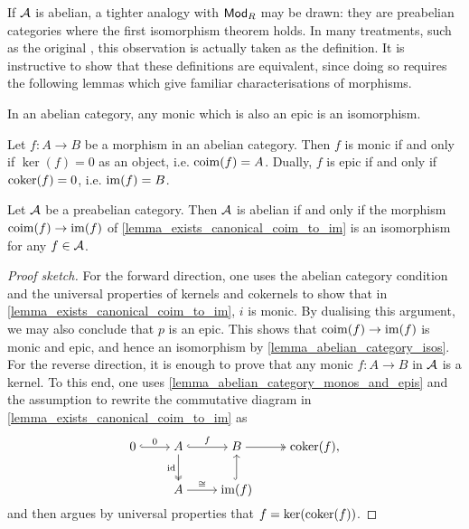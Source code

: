 

If $\mathcal{A}$ is abelian, a tighter analogy with ${\mathsf{Mod}}_{{R}}$ may be
drawn: they are preabelian categories where the first isomorphism theorem holds.
In many treatments, such as the original \cite{tohoku}, this
observation is actually taken as the definition.
It is instructive to show that these definitions are equivalent,
since doing so requires the following lemmas which give familiar
characterisations of morphisms.

\begin{lemma}
  \label{lemma_abelian_category_isos}
  In an abelian category, any monic which is also an epic is an isomorphism.
\end{lemma}

\begin{lemma}
  \label{lemma_abelian_category_monos_and_epis}
  Let $f: A \to B$ be a morphism in an abelian category.
  Then $f$ is monic if and only if $\ker(f) = 0$ as an object, i.e.
  $\operatorname{coim}(f) = A$.
  Dually, $f$ is epic if and only if $\operatorname{coker}(f) = 0$, i.e. $\operatorname{im}(f) = B$.
\end{lemma}

\begin{proposition}
  Let $\mathcal{A}$ be a preabelian category.
  Then $\mathcal{A}$ is abelian if and only if the morphism $\operatorname{coim}(f)
  \to \operatorname{im}(f)$ of \cref{lemma_exists_canonical_coim_to_im} is an
  isomorphism for any $f \in \mathcal{A}$.
\end{proposition}

\begin{proof}[Proof sketch]
  For the forward direction, one uses the abelian category condition
  and the universal properties of kernels and cokernels to show that
  in \cref{lemma_exists_canonical_coim_to_im}, $i$ is monic. By
  dualising this argument, we may also conclude that $p$ is an epic.
  This shows that $\operatorname{coim}(f) \to \operatorname{im}(f)$ is monic and epic, and hence
  an isomorphism by \cref{lemma_abelian_category_isos}.
  For the reverse direction, it is enough to prove that any monic $f:
  A \to B$ in $\mathcal{A}$ is a kernel.
  To this end, one uses \cref{lemma_abelian_category_monos_and_epis}
  and the assumption to rewrite the commutative diagram in
  \cref{lemma_exists_canonical_coim_to_im} as
  \[
    \begin{tikzcd}[cramped]
      0 & A & B & {\coker(f)}, \\
      & A & {\im(f)}
      \arrow["0", hook, from=1-1, to=1-2]
      \arrow["f", hook, from=1-2, to=1-3]
      \arrow["\id"', two heads, from=1-2, to=2-2]
      \arrow[two heads, from=1-3, to=1-4]
      \arrow["\cong", from=2-2, to=2-3]
      \arrow[hook, from=2-3, to=1-3]
    \end{tikzcd}
  \]
  and then argues by universal properties that $f = \ker(\operatorname{coker}(f))$.
\end{proof}
